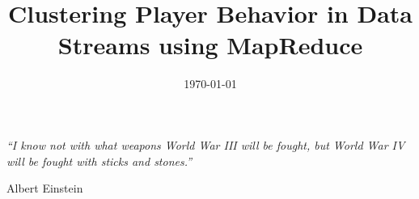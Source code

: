 \documentclass[a4paper, 11pt, oneside]{Thesis}  %
\numberwithin{algorithm}{chapter}
\begin{document}
\renewcommand{\listofalgorithms}{\begingroup
\tocfile{List of Algorithms}{loa}
\endgroup}
\makeatletter
\let\l@algorithm\l@figure
\makeatother

\frontmatter	  %

\title  {Clustering Player Behavior in Data Streams using MapReduce}
\addresses  {\groupname\\\deptname\\\univname}  %
\date       {\today}
\subject    {}
\keywords   {}

\maketitle


\fancyhead{}  %
\rhead{\thepage}  %
\lhead{}  %

\pagestyle{fancy}  %


\pagestyle{empty}  %

\null\vfill
\textit{``I know not with what weapons World War III will be fought, but World War IV will be fought with sticks and stones.''}

\begin{flushright}
Albert Einstein
\end{flushright}

\vfill\vfill\vfill\vfill\vfill\vfill\null
\clearpage  %

\end{document}
